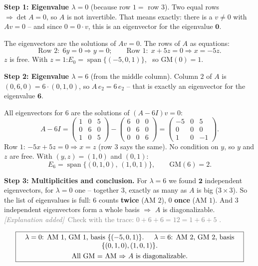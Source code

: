 \documentclass[a4paper,12pt]{article}
\newcommand{\erglerk}{\textcolor{gray}{\small\textit{[Explanation added]}}}
\begin{document}
\textbf{Step 1: Eigenvalue $\lambda = 0$} (because row $1 =$ row $3$). Two equal rows $\Rightarrow \det A = 0$, so $A$ is not invertible. That means exactly: there is a $v \neq 0$ with $Av = 0$ -- and since $0 = 0 \cdot v$, this is an eigenvector for the eigenvalue $\mathbf{0}$.

The eigenvectors are the solutions of $Av = 0$. The rows of $A$ as equations:
\[
\text{Row 2:}\ \ 6y = 0 \Rightarrow y = 0; \qquad \text{Row 1:}\ \ x + 5z = 0 \Rightarrow x = -5z.
\]
$z$ is free. With $z = 1$:\quad $E_0 = \operatorname{span}\{(-5, 0, 1)\}$, \ so $\text{GM}(0) = 1$.

\textbf{Step 2: Eigenvalue $\lambda = 6$} (from the middle column). Column $2$ of $A$ is $(0,6,0) = 6\cdot(0,1,0)$, so $A\,e_2 = 6\,e_2$ -- that is exactly an eigenvector for the eigenvalue $\mathbf{6}$.

All eigenvectors for $6$ are the solutions of $(A - 6I)v = 0$:
\[
A - 6I = \begin{pmatrix} 1 & 0 & 5 \\ 0 & 6 & 0 \\ 1 & 0 & 5 \end{pmatrix} - \begin{pmatrix} 6 & 0 & 0 \\ 0 & 6 & 0 \\ 0 & 0 & 6 \end{pmatrix} = \begin{pmatrix} -5 & 0 & 5 \\ 0 & 0 & 0 \\ 1 & 0 & -1 \end{pmatrix}.
\]
Row $1$: $-5x + 5z = 0 \Rightarrow x = z$ (row $3$ says the same). No condition on $y$, so $y$ and $z$ are free. With $(y,z) = (1,0)$ and $(0,1)$:
\[
E_6 = \operatorname{span}\{(0,1,0),\, (1,0,1)\}, \qquad \text{GM}(6) = 2.
\]

\textbf{Step 3: Multiplicities and conclusion.} For $\lambda = 6$ we found $\mathbf{2}$ independent eigenvectors, for $\lambda = 0$ one -- together $3$, exactly as many as $A$ is big ($3\times3$). So the list of eigenvalues is full: $6$ counts \textbf{twice} (AM $2$), $0$ \textbf{once} (AM $1$). And $3$ independent eigenvectors form a whole basis $\Rightarrow$ $A$ is diagonalizable.
\erglerk\ \textcolor{gray}{\small Check with the trace: $0 + 6 + 6 = 12 = 1+6+5$ \checkmark.}

\[
\fbox{\parbox{0.93\textwidth}{\centering
$\lambda = 0$: AM $1$, GM $1$, basis $\{(-5,0,1)\}$. \quad
$\lambda = 6$: AM $2$, GM $2$, basis $\{(0,1,0),(1,0,1)\}$. \\[3pt]
All GM $=$ AM $\Rightarrow$ $A$ is diagonalizable.
}}
\]
\end{document}
